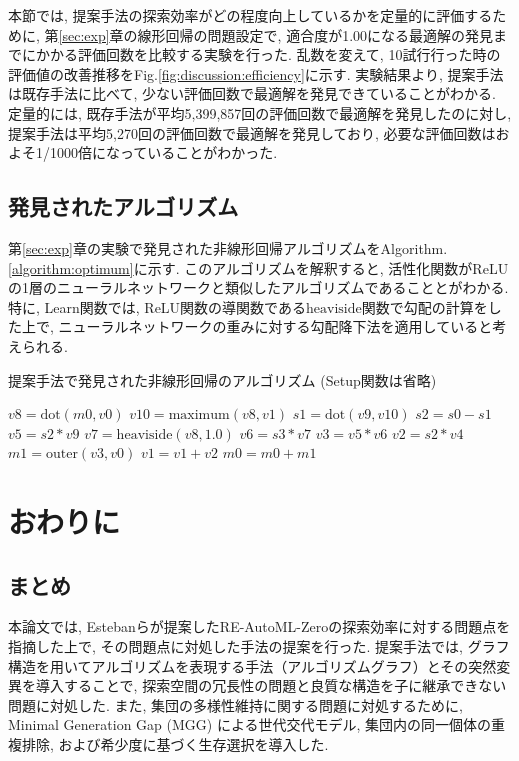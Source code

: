 \documentclass[a4paper,11pt,twocolumn]{jarticle}
\begin{document}
本節では, 提案手法の探索効率がどの程度向上しているかを定量的に評価するために, 第\ref{sec:exp}章の線形回帰の問題設定で, 適合度が1.00になる最適解の発見までにかかる評価回数を比較する実験を行った. 乱数を変えて, 10試行行った時の評価値の改善推移をFig.\ref{fig:discussion:efficiency}に示す. 実験結果より, 提案手法は既存手法に比べて, 少ない評価回数で最適解を発見できていることがわかる. 定量的には, 既存手法が平均5,399,857回の評価回数で最適解を発見したのに対し, 提案手法は平均5,270回の評価回数で最適解を発見しており, 必要な評価回数はおよそ1/1000倍になっていることがわかった.


\subsection{発見されたアルゴリズム}

第\ref{sec:exp}章の実験で発見された非線形回帰アルゴリズムをAlgorithm.\ref{algorithm:optimum}に示す. このアルゴリズムを解釈すると, 活性化関数がReLUの1層のニューラルネットワークと類似したアルゴリズムであることとがわかる. 特に, Learn関数では, ReLU関数の導関数である$\mathrm{heaviside}$関数で勾配の計算をした上で, ニューラルネットワークの重みに対する勾配降下法を適用していると考えられる.

\begin{algorithm}[tb]
  \caption{提案手法で発見された非線形回帰のアルゴリズム (Setup関数は省略)}
  \label{algorithm:optimum}
  \begin{algorithmic}[1]
    \State $v8 = \mathrm{dot}(m0, v0)$
    \State $v10 = \mathrm{maximum}(v8, v1)$
    \State $s1 = \mathrm{dot}(v9, v10)$
    \EndFunction
    \State $s2 = s0 - s1$
    \State $v5 = s2 * v9$
    \State $v7 = \mathrm{heaviside}(v8, 1.0)$
    \State $v6 = s3 * v7$
    \State $v3 = v5 * v6$
    \State $v2 = s2 * v4$
    \State $m1 = \mathrm{outer}(v3, v0)$
    \State $v1 = v1 + v2$
    \State $m0 = m0 + m1$
    \EndFunction
  \end{algorithmic}
\end{algorithm}


\section{おわりに}
\subsection{まとめ}
本論文では, Estebanらが提案したRE-AutoML-Zeroの探索効率に対する問題点を指摘した上で, その問題点に対処した手法の提案を行った. 提案手法では, グラフ構造を用いてアルゴリズムを表現する手法（アルゴリズムグラフ）とその突然変異を導入することで, 探索空間の冗長性の問題と良質な構造を子に継承できない問題に対処した. また, 集団の多様性維持に関する問題に対処するために, Minimal Generation Gap (MGG) \cite{mgg}による世代交代モデル, 集団内の同一個体の重複排除, および希少度に基づく生存選択を導入した.
\end{document}
